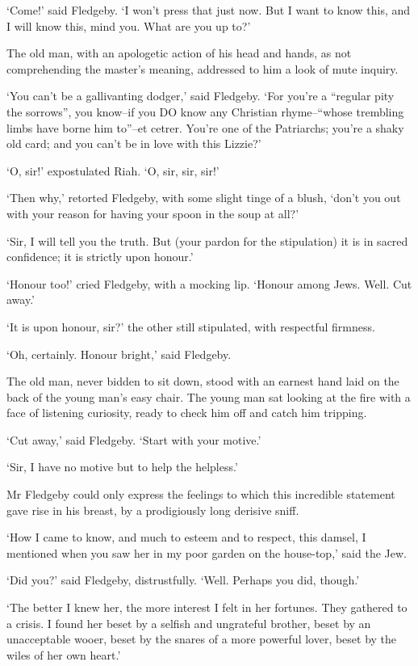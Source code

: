 ‘Come!’ said Fledgeby. ‘I won’t press that just now. But I want to know
this, and I will know this, mind you. What are you up to?’

The old man, with an apologetic action of his head and hands, as not
comprehending the master’s meaning, addressed to him a look of mute
inquiry.

‘You can’t be a gallivanting dodger,’ said Fledgeby. ‘For you’re a
“regular pity the sorrows”, you know--if you DO know any Christian
rhyme--“whose trembling limbs have borne him to”--et cetrer. You’re one
of the Patriarchs; you’re a shaky old card; and you can’t be in love
with this Lizzie?’

‘O, sir!’ expostulated Riah. ‘O, sir, sir, sir!’

‘Then why,’ retorted Fledgeby, with some slight tinge of a blush, ‘don’t
you out with your reason for having your spoon in the soup at all?’

‘Sir, I will tell you the truth. But (your pardon for the stipulation)
it is in sacred confidence; it is strictly upon honour.’

‘Honour too!’ cried Fledgeby, with a mocking lip. ‘Honour among Jews.
Well. Cut away.’

‘It is upon honour, sir?’ the other still stipulated, with respectful
firmness.

‘Oh, certainly. Honour bright,’ said Fledgeby.

The old man, never bidden to sit down, stood with an earnest hand laid
on the back of the young man’s easy chair. The young man sat looking at
the fire with a face of listening curiosity, ready to check him off and
catch him tripping.

‘Cut away,’ said Fledgeby. ‘Start with your motive.’

‘Sir, I have no motive but to help the helpless.’

Mr Fledgeby could only express the feelings to which this incredible
statement gave rise in his breast, by a prodigiously long derisive
sniff.

‘How I came to know, and much to esteem and to respect, this damsel, I
mentioned when you saw her in my poor garden on the house-top,’ said the
Jew.

‘Did you?’ said Fledgeby, distrustfully. ‘Well. Perhaps you did,
though.’

‘The better I knew her, the more interest I felt in her fortunes. They
gathered to a crisis. I found her beset by a selfish and ungrateful
brother, beset by an unacceptable wooer, beset by the snares of a more
powerful lover, beset by the wiles of her own heart.’


